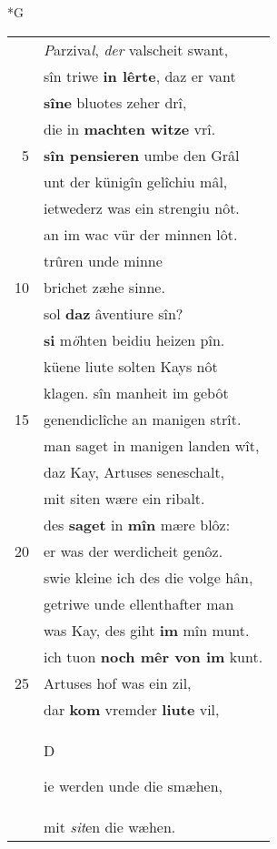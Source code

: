 \documentclass[8pt,a4paper,notitlepage]{article}
\begin{document}
\newpage
\begin{table}[ht]
\begin{minipage}[t]{0.5\linewidth}
\small
\begin{center}*G
\end{center}
\begin{tabular}{rl}
 & \textit{P}arziva\textit{l}, \textit{der} valscheit swant,\\ 
 & sîn triwe \textbf{in lêrte}, daz er vant\\ 
 & \textbf{sîne} bluotes zeher drî,\\ 
 & die in \textbf{machten witze} vrî.\\ 
5 & \textbf{sîn pensieren} umbe den Grâl\\ 
 & unt der künigîn gelîchiu mâl,\\ 
 & ietwederz was ein strengiu nôt.\\ 
 & an im wac vür der minnen lôt.\\ 
 & trûren unde minne\\ 
10 & brichet zæhe sinne.\\ 
 & sol \textbf{daz} âventiure sîn?\\ 
 & \textbf{si} m\textit{ö}hten beidiu heizen pîn.\\ 
 & küene liute solten Kays nôt\\ 
 & klagen. sîn manheit im gebôt\\ 
15 & genendiclîche an manigen strît.\\ 
 & man saget in manigen landen wît,\\ 
 & daz Kay, Artuses seneschalt,\\ 
 & mit siten wære ein ribalt.\\ 
 & des \textbf{saget} in \textbf{mîn} mære blôz:\\ 
20 & er was der werdicheit genôz.\\ 
 & swie kleine ich des die volge hân,\\ 
 & getriwe unde ellenthafter man\\ 
 & was Kay, des giht \textbf{im} mîn munt.\\ 
 & ich tuon \textbf{noch mêr von im} kunt.\\ 
25 & Artuses hof was ein zil,\\ 
 & dar \textbf{kom} vremder \textbf{liute} vil,\\ 
 & \begin{large}D\end{large}ie werden unde die smæhen,\\ 
 & mit \textit{sit}en die wæhen.\\ 

\end{tabular}
\end{minipage}
\end{table}
\end{document}
